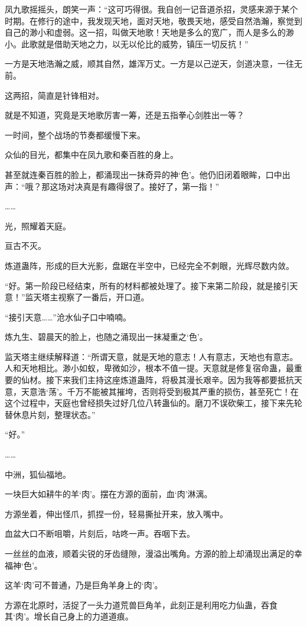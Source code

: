 \begin{this_body}
凤九歌摇摇头，朗笑一声：“这可巧得很。我自创一记音道杀招，灵感来源于某个时期。在修行的途中，我发现天地，面对天地，敬畏天地，感受自然浩瀚，察觉到自己的渺小和虚弱。这一招，叫做天地歌！天地是多么的宽广，而人是多么的渺小。此歌就是借助天地之力，以无以伦比的威势，镇压一切反抗！”

一方是天地浩瀚之威，顺其自然，雄浑万丈。一方是以己逆天，剑道决意，一往无前。

这两招，简直是针锋相对。

就是不知道，究竟是天地歌厉害一筹，还是五指拳心剑胜出一等？

一时间，整个战场的节奏都缓慢下来。

众仙的目光，都集中在凤九歌和秦百胜的身上。

甚至就连秦百胜的脸上，都涌现出一抹奇异的神‘色’。他仍旧闭着眼眸，口中出声：“哦？那这场对决真是有趣得很了。接好了，第一指！”

……

光，照耀着天庭。

亘古不灭。

炼道蛊阵，形成的巨大光影，盘踞在半空中，已经完全不刺眼，光辉尽数内敛。

“好。第一阶段已经结束，所有的材料都被处理了。接下来第二阶段，就是接引天意！”监天塔主视察了一番后，开口道。

“接引天意……”沧水仙子口中喃喃。

炼九生、碧晨天的脸上，也随之涌现出一抹凝重之‘色’。

监天塔主继续解释道：“所谓天意，就是天地的意志！人有意志，天地也有意志。人和天地相比。渺小如蚁，卑微如沙，根本不值一提。天意就是修复宿命蛊，最重要的仙材。接下来我们主持这座炼道蛊阵，将极其漫长艰辛。因为我等都要抵抗天意，天意浩‘荡’。千万不能被其摧垮，否则将受到极其严重的损伤，甚至死亡！在这个过程中，天庭也曾经损失过好几位八转蛊仙的。磨刀不误砍柴工，接下来先轮替休息片刻，整理状态。”

“好。”

……

中洲，狐仙福地。

一块巨大如耕牛的羊‘肉’。摆在方源的面前，血‘肉’淋漓。

方源坐着，伸出怪爪，抓捏一份，轻易撕扯开来，放入嘴中。

血盆大口不断咀嚼，片刻后，咕咚一声。吞咽下去。

一丝丝的血液，顺着尖锐的牙齿缝隙，漫溢出嘴角。方源的脸上却涌现出满足的幸福神‘色’。

这羊‘肉’可不普通，乃是巨角羊身上的‘肉’。

方源在北原时，活捉了一头力道荒兽巨角羊，此刻正是利用吃力仙蛊，吞食其‘肉’。增长自己身上的力道道痕。


\end{this_body}
